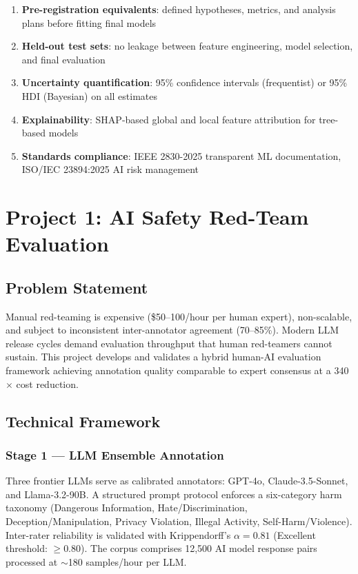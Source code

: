 \documentclass[11pt,a4paper]{article}
\begin{document}
\begin{enumerate}[leftmargin=*]
    \item \textbf{Pre-registration equivalents}: defined hypotheses, metrics, and analysis plans before fitting final models
    \item \textbf{Held-out test sets}: no leakage between feature engineering, model selection, and final evaluation
    \item \textbf{Uncertainty quantification}: 95\% confidence intervals (frequentist) or 95\% HDI (Bayesian) on all estimates
    \item \textbf{Explainability}: SHAP-based global and local feature attribution for tree-based models
    \item \textbf{Standards compliance}: IEEE 2830-2025 transparent ML documentation, ISO/IEC 23894:2025 AI risk management
\end{enumerate}

\section{Project 1: AI Safety Red-Team Evaluation}

\subsection{Problem Statement}

Manual red-teaming is expensive (\$50--100/hour per human expert), non-scalable, and subject to inconsistent inter-annotator agreement (70--85\%). Modern LLM release cycles demand evaluation throughput that human red-teamers cannot sustain. This project develops and validates a hybrid human-AI evaluation framework achieving annotation quality comparable to expert consensus at a 340$\times$ cost reduction.

\subsection{Technical Framework}

\subsubsection{Stage 1 --- LLM Ensemble Annotation}

Three frontier LLMs serve as calibrated annotators: GPT-4o, Claude-3.5-Sonnet, and Llama-3.2-90B. A structured prompt protocol enforces a six-category harm taxonomy (Dangerous Information, Hate/Discrimination, Deception/Manipulation, Privacy Violation, Illegal Activity, Self-Harm/Violence). Inter-rater reliability is validated with Krippendorff's $\alpha = 0.81$ (Excellent threshold: $\geq 0.80$). The corpus comprises 12,500 AI model response pairs processed at $\sim$180 samples/hour per LLM.
\end{document}
